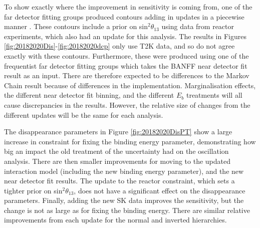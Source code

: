 To show exactly where the improvement in sensitivity is coming from, one of the far detector fitting groups produced contours adding in updates in a piecewise manner \cite{tn397}. These contours include a prior\cite{pdg} on sin$^2\theta_{13}$ using data from reactor experiments, which also had an update for this analysis. The results in Figures \ref{fig:20182020Dis}-\ref{fig:20182020dcp} only use T2K data, and so do not agree exactly with these contours. Furthermore, these were produced using one of the frequentist far detector fitting groups which takes the BANFF near detector fit result as an input. There are therefore expected to be differences to the Markov Chain result because of differences in the implementation. Marginalisation effects, the different near detector fit binning, and the different $E_b$ treatments will all cause discrepancies in the results. However, the relative size of changes from the different updates will be the same for each analysis.

The disappearance parameters in Figure \ref{fig:20182020DisPT} show a large increase in constraint for fixing the binding energy parameter, demonstrating how big an impact the old treatment of the uncertainty had on the oscillation analysis. There are then smaller improvements for moving to the updated interaction model (including the new binding energy parameter), and the new near detector fit results. The update to the reactor constraint, which sets a tighter prior on sin$^2\theta_{13}$, does not have a significant effect on the disappearance parameters. Finally, adding the new SK data improves the sensitivity, but the change is not as large as for fixing the binding energy. There are similar relative improvements from each update for the normal and inverted hierarchies. 

